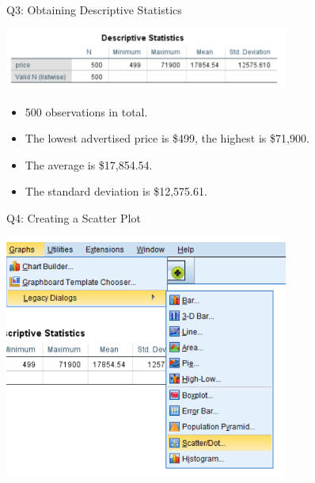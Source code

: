 \documentclass[11pt]{beamer}
\begin{document}
\begin{frame}{Q3: Obtaining Descriptive Statistics}
  \begin{center}
    \includegraphics[width=0.7\textwidth]{f150-descriptives.png}
  \end{center}
  \begin{itemize}
    \item 500 observations in total.
    \item The lowest advertised price is \$499, the highest is \$71,900.
    \item The average is \$17,854.54.
    \item The standard deviation is \$12,575.61.
  \end{itemize}
\end{frame}

\begin{frame}{Q4: Creating a Scatter Plot}
  \begin{center}
    \includegraphics[width=0.7\textwidth]{f150-graphs-legacy-scatter.png}
  \end{center}
\end{frame}
\end{document}
